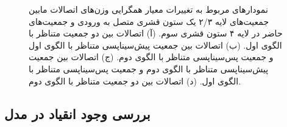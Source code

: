 \documentclass[12pt]{report}
\begin{document}
	\begin{figure}[]
		\centering
		\caption{
			نمودار‌های مربوط به تغییرات معیار همگرایی وزن‌های اتصالات مابین جمعیت‌های لایه ۲/۳ یک ستون قشری متصل به ورودی و جمعیت‌های حاضر در لایه ۴ ستون قشری سوم.
			(آ) اتصالات بین دو جمعیت متناظر با الگوی اول.
			(ب) اتصالات بین جمعیت پیش‌سیناپسی متناظر با الگوی اول و جمعیت پس‌سیناپسی متناظر با الگوی دوم.
			(ج) اتصالات بین جمعیت پیش‌سیناپسی متناظر با الگوی دوم و جمعیت پس‌سیناپسی متناظر با الگوی اول. 
			(د) اتصالات بین دو جمعیت متناظر با الگوی دوم.
		}
		\label{fig:convergence}
	\end{figure}
	
	\subsection{بررسی وجود انقیاد در مدل}
	
\end{document}

